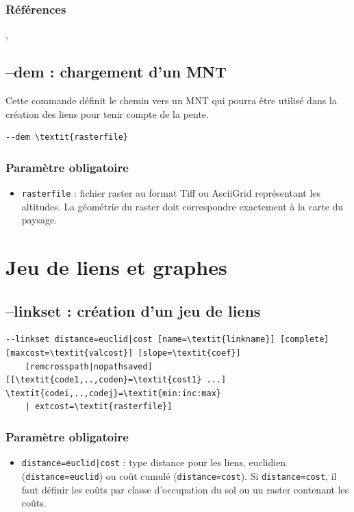 \documentclass[a4paper,10pt]{report}
\begin{document}
\subsubsection{Références}
\cite{2015_monkey}, \cite{2016_campagnole}

\subsection{--dem : chargement d'un MNT}
Cette commande définit le chemin vers un MNT qui pourra être utilisé dans la création des liens pour tenir compte de la pente.
\begin{Verbatim}[commandchars=\\\{\}]
--dem \textit{rasterfile}
\end{Verbatim}

\subsubsection{Paramètre obligatoire}
\begin{itemize}
	\item \verb|rasterfile| : fichier raster au format Tiff ou AsciiGrid représentant les altitudes. La géométrie du raster doit correspondre exactement à la carte du paysage.
\end{itemize}

\section{Jeu de liens et graphes}

\subsection{--linkset : création d'un jeu de liens}
\begin{Verbatim}[commandchars=\\\{\}]
--linkset distance=euclid|cost [name=\textit{linkname}] [complete] [maxcost=\textit{valcost}] [slope=\textit{coef}]
	[remcrosspath|nopathsaved] [[\textit{code1,..,coden}=\textit{cost1} ...] \textit{codei,..,codej}=\textit{min:inc:max} 
	| extcost=\textit{rasterfile}]
\end{Verbatim}

\subsubsection{Paramètre obligatoire}
\begin{itemize}
	\item \verb+distance=euclid|cost+ : type distance pour les liens, euclidien (\verb|distance=euclid|) ou coût cumulé (\verb|distance=cost|). Si \verb|distance=cost|, il faut définir les coûts par classe d'occupation du sol ou un raster contenant les coûts.
\end{itemize}
\end{document}
